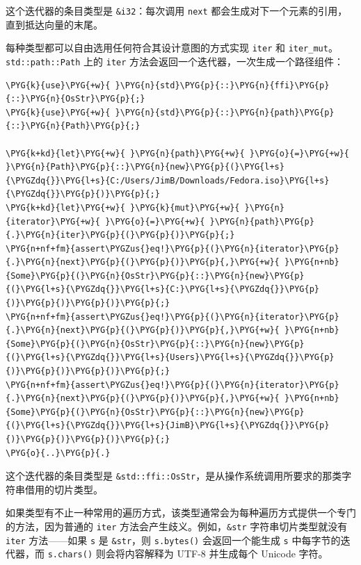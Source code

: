 这个迭代器的条目类型是 \texttt{\&i32}：每次调用 \texttt{next} 都会生成对下一个元素的引用，直到抵达向量的末尾。

每种类型都可以自由选用任何符合其设计意图的方式实现 \texttt{iter} 和 \texttt{iter\_mut}。\texttt{std::path::Path} 上的 \texttt{iter} 方法会返回一个迭代器，一次生成一个路径组件：

\begin{Verbatim}[commandchars=\\\{\},breaklines=true,breakanywhere=true,fontsize=\codefont,xleftmargin=17bp]
\PYG{k}{use}\PYG{+w}{ }\PYG{n}{std}\PYG{p}{::}\PYG{n}{ffi}\PYG{p}{::}\PYG{n}{OsStr}\PYG{p}{;}
\PYG{k}{use}\PYG{+w}{ }\PYG{n}{std}\PYG{p}{::}\PYG{n}{path}\PYG{p}{::}\PYG{n}{Path}\PYG{p}{;}

\PYG{k+kd}{let}\PYG{+w}{ }\PYG{n}{path}\PYG{+w}{ }\PYG{o}{=}\PYG{+w}{ }\PYG{n}{Path}\PYG{p}{::}\PYG{n}{new}\PYG{p}{(}\PYG{l+s}{\PYGZdq{}}\PYG{l+s}{C:/Users/JimB/Downloads/Fedora.iso}\PYG{l+s}{\PYGZdq{}}\PYG{p}{)}\PYG{p}{;}
\PYG{k+kd}{let}\PYG{+w}{ }\PYG{k}{mut}\PYG{+w}{ }\PYG{n}{iterator}\PYG{+w}{ }\PYG{o}{=}\PYG{+w}{ }\PYG{n}{path}\PYG{p}{.}\PYG{n}{iter}\PYG{p}{(}\PYG{p}{)}\PYG{p}{;}
\PYG{n+nf+fm}{assert\PYGZus{}eq!}\PYG{p}{(}\PYG{n}{iterator}\PYG{p}{.}\PYG{n}{next}\PYG{p}{(}\PYG{p}{)}\PYG{p}{,}\PYG{+w}{ }\PYG{n+nb}{Some}\PYG{p}{(}\PYG{n}{OsStr}\PYG{p}{::}\PYG{n}{new}\PYG{p}{(}\PYG{l+s}{\PYGZdq{}}\PYG{l+s}{C:}\PYG{l+s}{\PYGZdq{}}\PYG{p}{)}\PYG{p}{)}\PYG{p}{)}\PYG{p}{;}
\PYG{n+nf+fm}{assert\PYGZus{}eq!}\PYG{p}{(}\PYG{n}{iterator}\PYG{p}{.}\PYG{n}{next}\PYG{p}{(}\PYG{p}{)}\PYG{p}{,}\PYG{+w}{ }\PYG{n+nb}{Some}\PYG{p}{(}\PYG{n}{OsStr}\PYG{p}{::}\PYG{n}{new}\PYG{p}{(}\PYG{l+s}{\PYGZdq{}}\PYG{l+s}{Users}\PYG{l+s}{\PYGZdq{}}\PYG{p}{)}\PYG{p}{)}\PYG{p}{)}\PYG{p}{;}
\PYG{n+nf+fm}{assert\PYGZus{}eq!}\PYG{p}{(}\PYG{n}{iterator}\PYG{p}{.}\PYG{n}{next}\PYG{p}{(}\PYG{p}{)}\PYG{p}{,}\PYG{+w}{ }\PYG{n+nb}{Some}\PYG{p}{(}\PYG{n}{OsStr}\PYG{p}{::}\PYG{n}{new}\PYG{p}{(}\PYG{l+s}{\PYGZdq{}}\PYG{l+s}{JimB}\PYG{l+s}{\PYGZdq{}}\PYG{p}{)}\PYG{p}{)}\PYG{p}{)}\PYG{p}{;}
\PYG{o}{..}\PYG{p}{.}
\end{Verbatim}

这个迭代器的条目类型是 \texttt{\&std::ffi::OsStr}，是从操作系统调用所要求的那类字符串借用的切片类型。

如果类型有不止一种常用的遍历方式，该类型通常会为每种遍历方式提供一个专门的方法，因为普通的 \texttt{iter} 方法会产生歧义。例如，\texttt{\&str} 字符串切片类型就没有 \texttt{iter} 方法——如果 \texttt{s} 是 \texttt{\&str}，则 \texttt{s.bytes()} 会返回一个能生成 \texttt{s} 中每字节的迭代器，而 \texttt{s.chars()} 则会将内容解释为 UTF-8 并生成每个 Unicode 字符。

